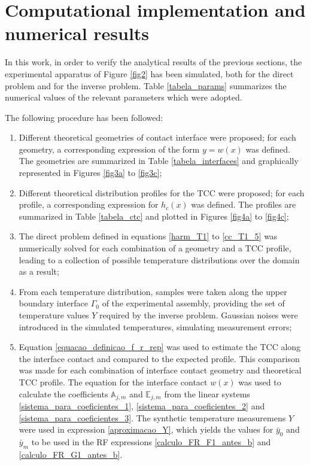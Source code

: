 \documentclass[12pt]{CHT-20}
\begin{document}
\section*{Computational implementation and numerical results}

In this work, in order to verify the analytical results of the previous sections, the experimental apparatus of Figure \ref{fig2} has been simulated, both for the direct problem and for the inverse problem. Table \ref{tabela_params} summarizes the numerical values of the relevant parameters which were adopted. 

The following procedure has been followed:
\begin{enumerate}
	\item Different theoretical geometries of contact interface were proposed; for each geometry, a corresponding expression of the form $y = w(x)$ was defined. The geometries are summarized in Table \ref{tabela_interfaces} and graphically represented in Figures \ref{fig3a} to \ref{fig3c};
	\item Different theoretical distribution profiles for the TCC were proposed; for each profile, a corresponding expression for $h_c(x)$ was defined. The profiles are summarized in Table \ref{tabela_ctc} and plotted in Figures \ref{fig4a} to \ref{fig4c};
	\item The direct problem defined in equations \eqref{harm_T1} to \eqref{cc_T1_5} was numerically solved for each combination of a geometry and a TCC profile, leading to a collection of possible temperature distributions over the domain as a result;
	\item From each temperature distribution, samples were taken along the upper boundary interface $\Gamma_0$ of the experimental assembly, providing the set of temperature values $Y$ required by the inverse problem. Gaussian noises were introduced in the simulated temperatures, simulating measurement errors;
	\item Equation \eqref{equacao_definicao_f_r_rep} was used to estimate the TCC along the interface contact and compared to the expected profile. This comparison was made for each combination of interface contact geometry and theoretical TCC profile. The equation for the interface contact $w(x)$ was used to calculate the coefficients $\mathbb{A}_{j,m}$ and $\mathbb{E}_{j,m}$ from the linear systems \eqref{sistema_para_coeficientes_1}, \eqref{sistema_para_coeficientes_2} and \eqref{sistema_para_coeficientes_3}. The synthetic temperature measuremens $Y$ were used in expression \eqref{aproximacao_Y}, which yields the values for $\bar{y}_0$ and $\bar{y}_m$ to be used in the RF expressions \eqref{calculo_FR_F1_antes_b} and \eqref{calculo_FR_G1_antes_b}.
\end{enumerate}
\end{document}
